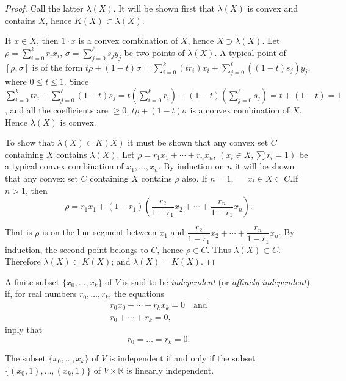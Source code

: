 \begin{proof}
Call the latter $\lambda(X)$. It will be shown first that $\lambda(X)$ is convex and contains $X$, hence $K(X)\subset \lambda(X)$.

It $x\in X$, then $1\cdot x$ is a convex combination of $X$, hence $X\supset \lambda(X)$. Let $\rho=\sum\limits^{k}_{i=0}r_{i}x_{i}$, $\sigma =\sum\limits^{\ell}_{j=0}s_{j}y_{j}$ be two points of $\lambda(X)$. A typical point of $[\rho,\sigma]$ is of the form $t\rho +(1-t)\sigma=\sum\limits^{k}_{i=0}(tr_{i})x_{i}+\sum\limits^{\ell}_{j=0}((1-t)s_{j})y_{j}$, where $0\leq t\leq 1$. Since $\sum\limits^{k}_{i=0}tr_{i}+\sum\limits^{\ell}_{j=0}(1-t)s_{j}=t(\sum\limits^{k}_{i=0}r_{i})+(1-t)(\sum\limits^{\ell}_{j=0}s_{j})=t+(1-t)=1$, and all the coefficients are $\geq 0$, $t\rho+(1-t)\sigma$ is a convex combination of $X$. Hence $\lambda(X)$ is convex.

To show that $\lambda(X)\subset K(X)$ it must be shown that any convex set $C$ containing $X$ contains $\lambda(X)$. Let $\rho=r_{1}x_{1}+\cdots+r_{n}x_{n}$, $(x_{i}\in X,\sum r_{i}=1)$ be a typical convex combination of $x_{1},\ldots,x_{n}$. By induction on $n$ it will be shown that any convex set $C$ containing $X$ contains $\rho$ also. If $n=1$, $=x_{i}\in X\subset C$.\pageoriginale If $n>1$, then
$$
\rho=r_{1}x_{1}+(1-r_{1}) \left(\dfrac{r_{2}}{1-r_{1}}x_{2}+\cdots+\dfrac{r_{n}}{1-r_{1}}x_{n} \right).  
$$

That is $\rho$ is on the line segment between $x_{1}$ and $\dfrac{r_{2}}{1-r_{1}}x_{2}+\cdots+\dfrac{r_{n}}{1-r_{1}}x_{n}$. By induction, the second point belongs to $C$, hence $\rho\in C$. Thus $\lambda(X)\subset C$. Therefore $\lambda(X)\subset K(X)$; and $\lambda(X)=K(X)$.
\end{proof}

\begin{definition}\label{chap1-defi1.2.3}
A finite subset $\{x_{0},\ldots,x_{k}\}$ of $V$ is said to be {\em independent} (or {\em affinely independent}), if, for real numbers $r_{0},\ldots,r_{k}$, the equations
\begin{gather*}
r_{0}x_{0}+\cdots+r_{k}x_{k}=0\quad\text{and}\\
r_{0}+\cdots+r_{k}=0,
\end{gather*}
inply that
$$
r_{0}=\ldots=r_{k}=0.
$$
\end{definition}

\begin{ex}\label{chap1-ex1.2.4}
The subset $\{x_{0},\ldots,x_{k}\}$ of $V$ is independent if and only if the subset $\{(x_{0},1),\ldots,(x_{k},1)\}$ of $V\times \mathbb{R}$ is linearly independent.
\end{ex}

